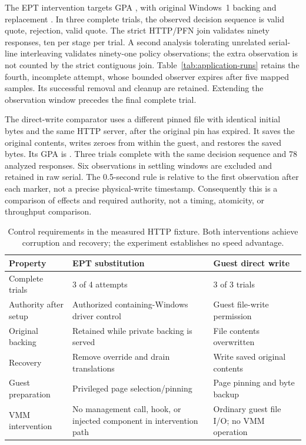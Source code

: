 The EPT intervention targets GPA , with original Windows~1
backing  and replacement . In three complete
trials, the observed decision sequence is valid quote, rejection, valid quote.
The strict HTTP/PFN join validates ninety responses, ten per stage per trial.
A second analysis tolerating unrelated serial-line interleaving validates
ninety-one policy observations; the extra observation is not counted by the
strict contiguous join. Table~\ref{tab:application-runs} retains the fourth,
incomplete attempt, whose bounded observer expires after five mapped samples.
Its successful removal and cleanup are retained. Extending the observation
window precedes the final complete trial.

\begin{table}[tbp]
\centering\small
\caption{Current EPT application attempts on 2026-09-16 UTC. The run suffix is
\texttt{HHMMSSmmm}. PFN age measures freshness of the associated pagemap sample.}
\label{tab:application-runs}

\end{table}

The direct-write comparator uses a different pinned file with identical initial
bytes and the same HTTP server, after the original pin has expired. It saves
the original contents, writes zeroes from within the guest, and restores the
saved bytes. Its GPA is . Three trials complete with the same
decision sequence and 78 analyzed responses. Six observations in settling
windows are excluded and retained in raw serial. The 0.5-second rule is relative
to the first observation after each marker, not a precise physical-write
timestamp. Consequently this is a comparison of effects and required authority,
not a timing, atomicity, or throughput comparison.

\begin{table}[tbp]
\centering\small
\caption{Control requirements in the measured HTTP fixture. Both interventions
achieve corruption and recovery; the experiment establishes no speed advantage.}
\label{tab:application-comparison}
\begin{tabularx}{\linewidth}{@{}lXX@{}}
\toprule
Property & EPT substitution & Guest direct write \\
\midrule
Complete trials & 3 of 4 attempts & 3 of 3 trials \\
Authority after setup & Authorized containing-Windows driver control & Guest file-write permission \\
Original backing & Retained while private backing is served & File contents overwritten \\
Recovery & Remove override and drain translations & Write saved original contents \\
Guest preparation & Privileged page selection/pinning & Page pinning and byte backup \\
VMM intervention & No management call, hook, or injected component in intervention path & Ordinary guest file I/O; no VMM operation \\
\bottomrule
\end{tabularx}
\end{table}

